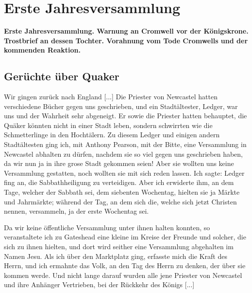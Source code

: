 

\chapter[Erste Jahresversammlung]{Erste Jahresversammlung}

\begin{center}
\textbf{Erste Jahresversammlung. Warnung an Cromwell vor 
der Königskrone. Trostbrief an dessen Tochter. Vorahnung 
vom Tode Cromwells und der kommenden Reaktion.}
\end{center}

\section{Gerüchte über Quaker}

Wir gingen zurück nach England [...] Die Priester
von Newcastel hatten verschiedene Bücher gegen uns geschrieben,
und ein Stadtältester, Ledger, war uns und der 
Wahrheit sehr  abgeneigt. Er sowie die Priester hatten 
behauptet, die Quäker könnten
nicht in einer Stadt leben, sondern schwirrten wie die Schmetterlinge
in den Hochtälern.  Zu diesem 
Ledger und einigen andern Stadtältesten ging ich, mit 
Anthony Pearson, mit der Bitte, eine 
Versammlung in Newcastel abhalten zu dürfen, 
nachdem sie so viel
gegen uns geschrieben haben, da wir nun ja in ihre grose Stadt
gekommen seien! Aber sie wollten uns keine Versammlung gestatten, 
noch wollten sie mit sich reden lassen. 
Ich sagte: 
Ledger fing an, die Sabbathheiligung  
 zu verteidigen. Aber ich
erwiderte ihm, an dem Tage, welcher der Sabbath sei, dem siebenten
Wochentag, hielten sie ja Märkte und Jahrmärkte; während der Tag,
an dem sich die, welche sich jetzt Christen nennen, versammeln, ja
der erste Wochentag sei. 


Da wir keine öffentliche Versammlung
unter ihnen halten konnten, so veranstaltete 
ich zu Gateshead
eine kleine im Kreise der Freunde und solcher, die sich zu ihnen
hielten, und dort wird seither eine Versammlung abgehalten im
Namen Jesu. Als ich über den Marktplatz ging, erfasste mich
die Kraft des Herrn, und ich ermahnte das Volk, an den Tag
des Herrn zu denken, der über sie kommen 
werde. Und nicht
lange darauf wurden alle jene Priester von Newcastel und ihre
Anhänger Vertrieben, bei der Rückkehr des Königs [...] 

